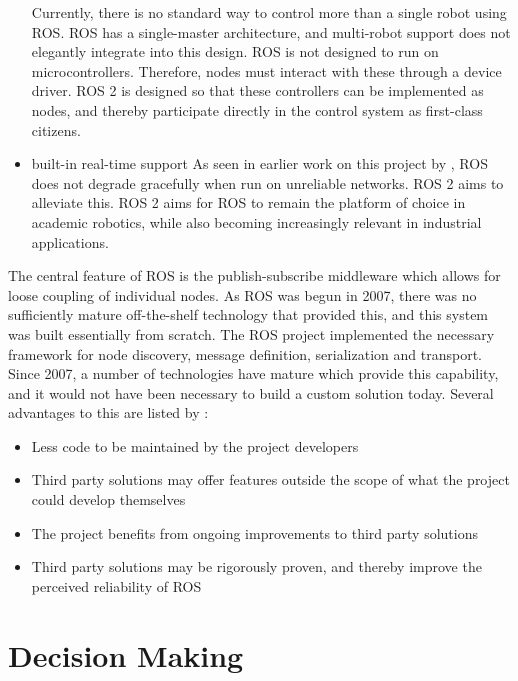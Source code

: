 \documentclass[\rootfolder/main.tex]{subfiles}
\begin{document}
\begin{itemize}
        Currently, there is no standard way to control more than a single robot using ROS.
        ROS has a single-master architecture, and multi-robot support does not elegantly integrate into this design.
        ROS is not designed to run on microcontrollers. Therefore, nodes must interact with these through a device driver.
        ROS 2 is designed so that these controllers can be implemented as nodes, and thereby participate directly in the control system as first-class citizens.
    \item{built-in real-time support}
        As seen in earlier work on this project by \cite{Waløen2017}, ROS does not degrade gracefully when run on unreliable networks.
        ROS 2 aims to alleviate this.
        ROS 2 aims for ROS to remain the platform of choice in academic robotics, while also becoming increasingly relevant in industrial applications.
\end{itemize}

The central feature of ROS is the publish-subscribe middleware which allows for loose coupling of individual nodes.
As ROS was begun in 2007, there was no sufficiently mature off-the-shelf technology that provided this, and this system was built essentially from scratch.
The ROS project implemented the necessary framework for node discovery, message definition, serialization and transport.
Since 2007, a number of technologies have mature which provide this capability, and it would not have been necessary to build a custom solution today.
Several advantages to this are listed by \cite{Gerkey2017}:

\begin{itemize}
    \item Less code to be maintained by the project developers
    \item Third party solutions may offer features outside the scope of what the project could develop themselves
    \item The project benefits from ongoing improvements to third party solutions
    \item Third party solutions may be rigorously proven, and thereby improve the perceived reliability of ROS
\end{itemize}

\section{Decision Making}
\end{document}
